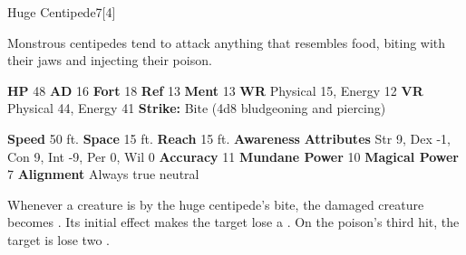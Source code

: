   \begin{monsection}{Huge Centipede}{7}[4]
    \vspace{-1em}\vspace{-1em}
    \vspace{0em}

    
    Monstrous centipedes tend to attack anything that resembles food, biting with their jaws and injecting their poison.
  
    

    \begin{spellcontent}
      \begin{spelltargetinginfo}
        \pari \textbf{HP} 48 \monsep
          \textbf{AD} 16 \monsep
          \textbf{Fort} 18 \monsep
          \textbf{Ref} 13 \monsep
          \textbf{Ment} 13
        \pari \textbf{WR} Physical 15, Energy 12 \monsep
        \textbf{VR} Physical 44, Energy 41
        \pari \textbf{Strike:}
            Bite  (4d8 bludgeoning and piercing)
      \end{spelltargetinginfo}
    \end{spellcontent}
    \begin{monsterfooter}
      \pari \textbf{Speed} 50 ft. \monsep
        \textbf{Space} 15 ft. \monsep
        \textbf{Reach} 15 ft.
      \pari \textbf{Awareness} 
      \pari \textbf{Attributes}
        Str 9, Dex -1,
        Con 9, Int -9,
        Per 0, Wil 0
      \pari \textbf{Accuracy} 11 \monsep
        \textbf{Mundane Power} 10 \monsep
      \textbf{Magical Power} 7
      \pari \textbf{Alignment} Always true neutral
    \end{monsterfooter}
  \end{monsection}
    Whenever a creature is  by the huge centipede's bite,
      the damaged creature becomes .
    Its initial effect makes the target lose a .
    On the poison's third hit, the target is lose two .
  
